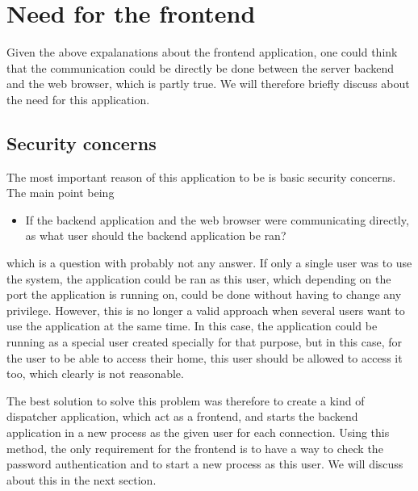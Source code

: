 \section{Need for the frontend}
Given the above expalanations about the frontend application, one could 
think that the communication could be directly be done between the 
server backend and the web browser, which is partly true. We will therefore
briefly discuss about the need for this application.
%
\subsection{Security concerns}
The most important reason of this application to be is basic security concerns. 
The main point being
\begin{itemize}
\item If the backend application and the web browser were communicating directly, 
  as what user should the backend application be ran?   
\end{itemize}
which is a question with probably not any answer. If only a single user was to 
use the system, the application could be ran as this user, which depending on the 
port the application is running on, could be done without having to change any privilege.
However, this is no longer a valid approach when several users want to use the application 
at the same time. In this case, the application could be running as a special user 
created specially for that purpose, but in this case, for the user to be able to access 
their home, this user should be allowed to access it too, which clearly is not reasonable.

The best solution to solve this problem was therefore to create a kind of dispatcher application, 
which act as a frontend, and starts the backend application in a new process as the given user 
for each connection. Using this method, the only requirement for the frontend is to have a
way to check the password authentication and to start a new process as this user. We will 
discuss about this in the next section.
